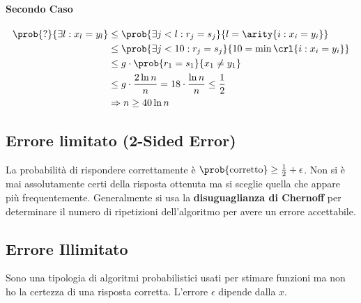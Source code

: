 \documentclass[\main/main.tex]{subfiles}
\begin{document}
\paragraph{Secondo Caso}
\begin{align*}
	\prob{?}{\exists l: x_l = y_l} & \leq \prob{\exists j < l: r_j = s_j}{l= \arity{i: x_i = y_i}}           \\
	                               & \leq \prob{\exists j < 10: r_j = s_j}{10 = \min\crl{i: x_i = y_i}}      \\
	                               & \leq g\cdot \prob{r_1 = s_1}{x_1 \neq y_1}                              \\
	                               & \leq g\cdot \frac{2\ln n}{n} = 18\cdot \frac{\ln n}{n} \leq \frac{1}{2} \\
	                               & \Rightarrow n \geq 40 \ln n
\end{align*}

\subsection{Errore limitato (2-Sided Error)}
La probabilità di rispondere correttamente è \(\prob{\text{corretto}} \geq \frac{1}{2} + \epsilon\). Non si è mai assolutamente certi della risposta ottenuta ma si sceglie quella che appare più frequentemente. Generalmente si usa la \textbf{disuguaglianza di Chernoff} per determinare il numero di ripetizioni dell'algoritmo per avere un errore accettabile.

\subsection{Errore Illimitato}
Sono una tipologia di algoritmi probabilistici usati per stimare funzioni ma non ho la certezza di una risposta corretta. L'errore \(\epsilon\) dipende dalla \(x\).
\end{document}

